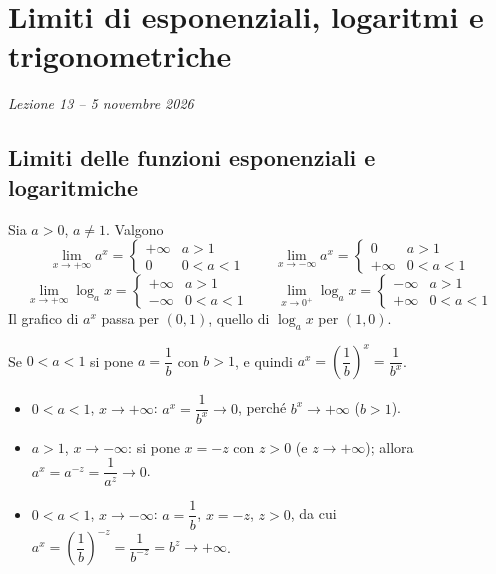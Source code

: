 \documentclass[11pt,a4paper]{article}
\begin{document}
\section[Limiti di esponenziali, logaritmi e trigonometriche (Lezione 13 -- 5 novembre 2026)]{Limiti di esponenziali, logaritmi e trigonometriche}
\noindent\emph{Lezione 13 -- 5 novembre 2026}
\subsection{Limiti delle funzioni esponenziali e logaritmiche}

Sia $a > 0$, $a \neq 1$. Valgono
\[
\lim_{x\to+\infty} a^x = \begin{cases} +\infty & a > 1 \\ 0 & 0 < a < 1 \end{cases}
\qquad
\lim_{x\to-\infty} a^x = \begin{cases} 0 & a > 1 \\ +\infty & 0 < a < 1 \end{cases}
\]
\[
\lim_{x\to+\infty} \log_a x = \begin{cases} +\infty & a > 1 \\ -\infty & 0 < a < 1 \end{cases}
\qquad
\lim_{x\to 0^+} \log_a x = \begin{cases} -\infty & a > 1 \\ +\infty & 0 < a < 1 \end{cases}
\]
Il grafico di $a^x$ passa per $(0, 1)$, quello di $\log_a x$ per $(1, 0)$.

\begin{esempio}
Se $0 < a < 1$ si pone $a = \dfrac{1}{b}$ con $b > 1$, e quindi $a^x = \left(\dfrac{1}{b}\right)^x = \dfrac{1}{b^x}$.
\begin{itemize}
  \item $0 < a < 1$, $x \to +\infty$: $a^x = \dfrac{1}{b^x} \to 0$, perché $b^x \to +\infty$ ($b > 1$).
  \item $a > 1$, $x \to -\infty$: si pone $x = -z$ con $z > 0$ (e $z \to +\infty$); allora $a^x = a^{-z} = \dfrac{1}{a^z} \to 0$.
  \item $0 < a < 1$, $x \to -\infty$: $a = \dfrac{1}{b}$, $x = -z$, $z > 0$, da cui $a^x = \left(\dfrac{1}{b}\right)^{-z} = \dfrac{1}{b^{-z}} = b^z \to +\infty$.
\end{itemize}
\end{esempio}
\end{document}
